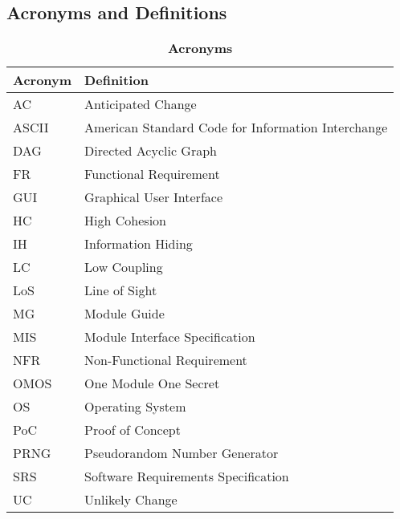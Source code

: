 \documentclass[12pt, titlepage]{article}
\begin{document}
    \subsection{Acronyms and Definitions}
        \begin{table}[H]
            \centering
            \caption{\bf Acronyms}
            \label{TableAcronym}
            \bigskip
            \def\arraystretch{1.5}
            \begin{tabularx}{\textwidth}{p{3.7cm}X}
                \toprule
                \textbf{Acronym} & \textbf{Definition} \\
                \midrule
                AC & Anticipated Change\\
                ASCII & American Standard Code for Information Interchange\\
                DAG & Directed Acyclic Graph\\
                FR & Functional Requirement\\
                GUI & Graphical User Interface\\
                HC & High Cohesion\\
                IH & Information Hiding\\
                LC & Low Coupling\\
                LoS & Line of Sight\\
                MG & Module Guide\\
                MIS & Module Interface Specification\\
                NFR & Non-Functional Requirement\\
                OMOS & One Module One Secret\\
                OS & Operating System\\
                PoC & Proof of Concept\\
                PRNG & Pseudorandom Number Generator\\ 
                SRS & Software Requirements Specification\\
                UC & Unlikely Change\\
            \bottomrule
            \end{tabularx}
        \end{table}
\end{document}
